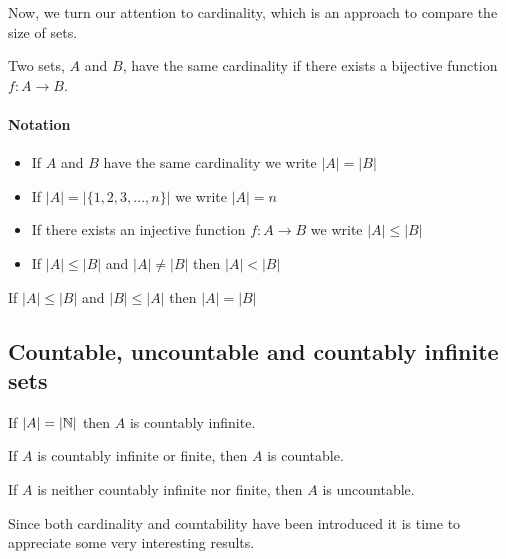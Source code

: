 Now, we turn our attention to cardinality, which is an approach to compare the size of sets.

\begin{definition}[Cardinality]
    Two sets, $A$ and $B$, have the same cardinality if there exists a bijective function $f: A \to B$.
\end{definition}

\paragraph{Notation}

\begin{itemize}
    \item If $A$ and $B$ have the same cardinality we write $|A| = |B|$
    \item If $|A| = |\{ 1, 2, 3, ..., n\}|$ we write $|A| = n$
    \item If there exists an injective function $f: A \to B$ we write $|A| \leq |B|$
    \item If $|A| \leq |B|$ and $|A| \neq |B|$ then $|A| < |B|$
\end{itemize}

\begin{theorem}
    If $|A| \leq |B|$ and $|B| \leq |A|$ then $|A| = |B|$
\end{theorem}

\subsection{Countable, uncountable and countably infinite sets}

\begin{definition}
    If $|A| = |\mathbb{N}|$ then $A$ is countably infinite.
\end{definition}

\begin{definition}
    If $A$ is countably infinite or finite, then $A$ is countable.
\end{definition}

\begin{definition}
    If $A$ is neither countably infinite nor finite, then $A$ is uncountable.
\end{definition}

Since both cardinality and countability have been introduced it is time to appreciate some very interesting results.

